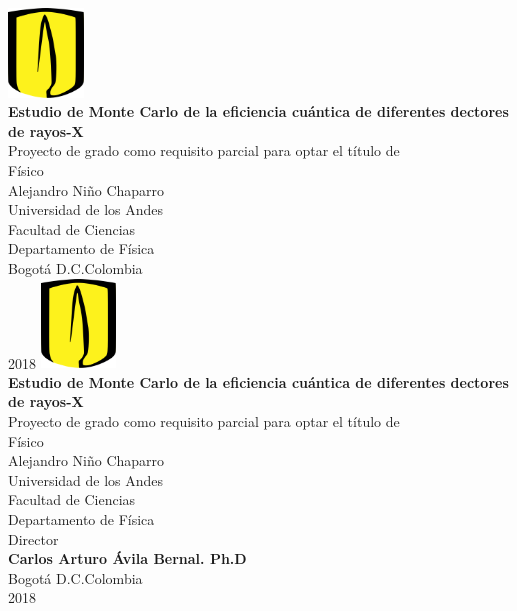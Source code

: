 \documentclass[12pt]{article}
\begin{document}
\begin{center}
\includegraphics[width=2cm]{logo.png}\\
\vspace{1cm}
\textbf{{\LARGE Estudio de Monte Carlo de la eficiencia
cuántica de diferentes dectores de rayos-X }}\\
\vspace{2.3cm}
{\LARGE{Proyecto de grado como requisito parcial para optar el título de }}\\
\vspace{1.0cm}
\centering
{\LARGE{Físico}}\\
\vspace{2.0cm}
{\large Alejandro Niño Chaparro}\\
\vspace{2.3cm}
Universidad de los Andes\\
Facultad de Ciencias\\
Departamento de Física\\
\vspace{2.3cm}
Bogotá D.C.\hspace{0.1cm}Colombia\\
2018
\newpage
\thispagestyle{empty}
\includegraphics[width=2cm]{logo.png}\\
\vspace{1cm}
\textbf{{\LARGE Estudio de Monte Carlo de la eficiencia
cuántica de diferentes dectores de rayos-X}}\\
\vspace{1.3cm}
{\LARGE{Proyecto de grado como requisito parcial para optar el título de}}\\
\vspace{1.0cm}
\centering
{\LARGE{Físico}}\\
\vspace{2.0cm}
{\large Alejandro Niño Chaparro}\\
\vspace{2.3cm}
Universidad de los Andes\\
Facultad de Ciencias\\
Departamento de Física\\
\vspace{1.3cm}
Director\\
\textbf{\large{Carlos Arturo Ávila Bernal. Ph.D}}\\
\vspace{0.5cm}
Bogotá D.C.\hspace{0.1cm}Colombia\\
2018
\end{center}
\tableofcontents %
\listoftables %
\end{document}
